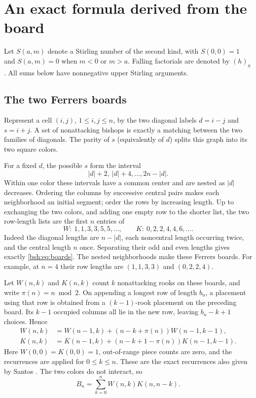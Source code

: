 \documentclass[11pt,letterpaper]{article}
\theoremstyle{remark}\newtheorem{remark}[theorem]{Remark}
\newcommand{\fall}[2]{(#1)_{\underline{#2}}}
\begin{document}
\section{An exact formula derived from the board}\label{bsh:sec:exact}
Let $S(a,m)$ denote a Stirling number of the second kind, with $S(0,0)=1$ and $S(a,m)=0$ when $m<0$ or $m>a$. Falling factorials are denoted by $\fall{h}{a}$. All sums below have nonnegative upper Stirling arguments.

\subsection{The two Ferrers boards}
Represent a cell $(i,j)$, $1\leq i,j\leq n$, by the two diagonal labels $d=i-j$ and $s=i+j$. A set of nonattacking bishops is exactly a matching between the two families of diagonals. The parity of $s$ (equivalently of $d$) splits this graph into its two square colors.

For a fixed $d$, the possible $s$ form the interval
\[
 |d|+2,\ |d|+4,\ldots,2n-|d|.
\]
Within one color these intervals have a common center and are nested as $|d|$ decreases. Ordering the columns by successive central pairs makes each neighborhood an initial segment; order the rows by increasing length. Up to exchanging the two colors, and adding one empty row to the shorter list, the two row-length lists are the first $n$ entries of
\begin{equation}\label{bsh:eq:boards}
 W:\ 1,1,3,3,5,5,\ldots,\qquad
 K:\ 0,2,2,4,4,6,\ldots.
\end{equation}
Indeed the diagonal lengths are $n-|d|$, each noncentral length occurring twice, and the central length $n$ once. Separating their odd and even lengths gives exactly \eqref{bsh:eq:boards}. The nested neighborhoods make these Ferrers boards. For example, at $n=4$ their row lengths are $(1,1,3,3)$ and $(0,2,2,4)$.

Let $W(n,k)$ and $K(n,k)$ count $k$ nonattacking rooks on these boards, and write $\pi(n)=n\bmod2$. On appending a longest row of length $b_n$, a placement using that row is obtained from a $(k-1)$-rook placement on the preceding board. Its $k-1$ occupied columns all lie in the new row, leaving $b_n-k+1$ choices. Hence
\begin{align}
 W(n,k)&=W(n-1,k)+(n-k+\pi(n))W(n-1,k-1),\label{bsh:eq:W}\\
 K(n,k)&=K(n-1,k)+(n-k+1-\pi(n))K(n-1,k-1).\label{bsh:eq:K}
\end{align}
Here $W(0,0)=K(0,0)=1$, out-of-range piece counts are zero, and the recurrences are applied for $0\leq k\leq n$. These are the exact recurrences also given by Santos \cite{santos}. The two colors do not interact, so
\begin{equation}\label{bsh:eq:conv}
 B_n=\sum_{k=0}^n W(n,k)K(n,n-k).
\end{equation}
\end{document}
